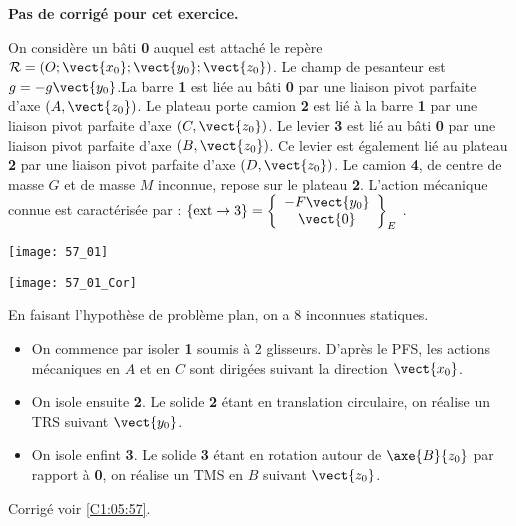 \normalfalse \difficiletrue \tdifficilefalse
\correctiontrue


\setcounter{numques}{0}
\ifcorrection
\else
\textbf{Pas de corrigé pour cet exercice.}
\fi

\ifprof
\else
On considère un bâti \textbf{0} auquel est attaché le repère$\mathcal{R}=\left(O;\vect{x_0};\vect{y_0};\vect{z_0} \right)$. Le champ de pesanteur est $g=-g\vect{y_0}$.La barre \textbf{1} est liée au bâti \textbf{0} par une liaison pivot parfaite d’axe $\left(A,\vect{z_0}\right)$. Le plateau porte camion \textbf{2} est lié à la barre \textbf{1} par une liaison pivot parfaite d’axe $\left(C,\vect{z_0}\right)$. Le levier \textbf{3} est lié au bâti \textbf{0} par une liaison pivot parfaite d’axe $\left(B,\vect{z_0}\right)$. Ce levier est également lié au plateau \textbf{2} par une liaison pivot parfaite d’axe $\left(D,\vect{z_0}\right)$. Le camion \textbf{4}, de centre de masse $G$ et de masse $M$ inconnue, repose sur le plateau \textbf{2}.
L’action mécanique connue est caractérisée par : $\{\text{ext}\rightarrow 3\}=\left\{
\begin{array}{c}
-F\vect{y_0} \\
\vect{0} \\
\end{array}
\right\}_E$ .


\begin{center}
\texttt{[image: 57\_01]}
\end{center}


\fi

\ifprof

\begin{center}
\texttt{[image: 57\_01\_Cor]}
\end{center}

En faisant l'hypothèse de problème plan, on a 8 inconnues statiques. 
\else
\fi



\ifprof
\begin{itemize}
\item On commence par isoler \textbf{1} soumis à 2 glisseurs. D'après le PFS, les actions mécaniques en $A$ et en $C$ sont dirigées suivant la direction $\vect{x_0}$.
\item On isole ensuite \textbf{2}. Le solide \textbf{2} étant en translation circulaire, on réalise un TRS suivant $\vect{y_0}$. 
\item On isole enfint \textbf{3}. Le solide \textbf{3} étant en rotation autour de $\axe{B}{z_0}$ par rapport à \textbf{0},  on réalise un TMS en $B$ suivant $\vect{z_0}$. 
\end{itemize}
\else
\fi
\ifprof
\else
\begin{flushright}
\footnotesize{Corrigé  voir \ref{C1:05:57}.}
\end{flushright}%
\fi